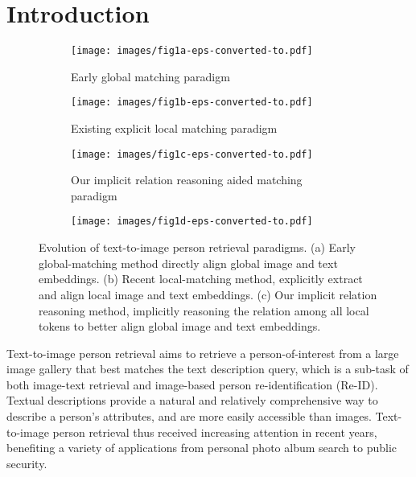 \documentclass[10pt,twocolumn,letterpaper]{article}
\begin{document}
\section{Introduction}
\label{sec:intro}

\begin{figure}
  \centering
  \begin{subfigure}[t]{\linewidth}
\centerline{\texttt{[image: images/fig1a-eps-converted-to.pdf]}}
    \caption{Early global matching paradigm}
    \label{fig1:a}
  \end{subfigure}

  \begin{subfigure}[t]{\linewidth}
\centerline{\texttt{[image: images/fig1b-eps-converted-to.pdf]}}
    \caption{Existing explicit local matching paradigm}
    \label{fig1:b}
  \end{subfigure}
  
  \begin{subfigure}[t]{\linewidth}
\centerline{\texttt{[image: images/fig1c-eps-converted-to.pdf]}}
    \caption{Our implicit relation reasoning aided matching paradigm}
    \label{fig1:c}
  \end{subfigure}

  \begin{subfigure}[t]{\linewidth}
\centerline{\texttt{[image: images/fig1d-eps-converted-to.pdf]}}
  \end{subfigure}
  
  \caption{Evolution of text-to-image person retrieval paradigms. (a) Early global-matching method directly align global image and text embeddings. (b) Recent local-matching method, explicitly extract and align local image and text embeddings. (c) Our implicit relation reasoning method, implicitly reasoning the relation among all local tokens to better align global image and text embeddings.}
  \label{fig1}
\end{figure}

Text-to-image person retrieval aims to retrieve a person-of-interest from a large image gallery that best matches the text description query\cite{li2017person}, which is a sub-task of both image-text retrieval\cite{lei2022loopitr, sun2021lightningdot, miech2021thinking} and image-based person re-identification (Re-ID)\cite{he2021transreid, luo2019bag, wang2022nformer}. 
Textual descriptions provide a natural and relatively comprehensive way to describe a person's attributes, and are more easily accessible than images. Text-to-image person retrieval thus received increasing attention in recent years, benefiting a variety of applications from personal photo album search to public security.
\end{document}
